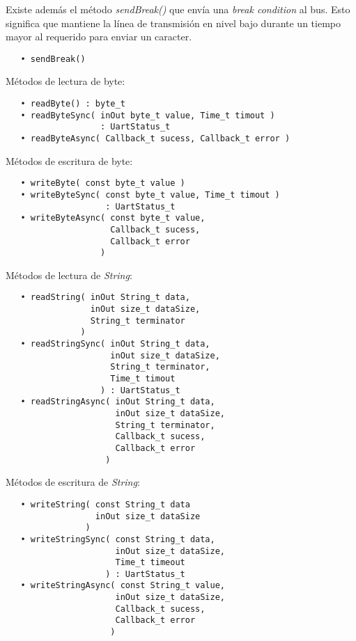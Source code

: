 Existe además el método \emph{sendBreak()} que envía una \emph{break condition} al bus. Esto significa que mantiene la línea de transmisión en nivel bajo durante un tiempo mayor al requerido para enviar un caracter.

\begin{verbatim}
   • sendBreak()
\end{verbatim}


Métodos de lectura de byte:

\begin{verbatim}
   • readByte() : byte_t
   • readByteSync( inOut byte_t value, Time_t timout )
                   : UartStatus_t
   • readByteAsync( Callback_t sucess, Callback_t error )
\end{verbatim}

Métodos de escritura de byte:

\begin{verbatim}
   • writeByte( const byte_t value )
   • writeByteSync( const byte_t value, Time_t timout )
                    : UartStatus_t
   • writeByteAsync( const byte_t value, 
                     Callback_t sucess,
                     Callback_t error 
                   )
\end{verbatim}

Métodos de lectura de \emph{String}:

\begin{verbatim}
   • readString( inOut String_t data,
                 inOut size_t dataSize,
                 String_t terminator
               )
   • readStringSync( inOut String_t data,
                     inOut size_t dataSize,
                     String_t terminator,
                     Time_t timout 
                   ) : UartStatus_t
   • readStringAsync( inOut String_t data,
                      inOut size_t dataSize,
   	                  String_t terminator,
                      Callback_t sucess, 
                      Callback_t error 
                    ) 
\end{verbatim}

Métodos de escritura de \emph{String}:                  
                
\begin{verbatim}  
   • writeString( const String_t data
                  inOut size_t dataSize
                )
   • writeStringSync( const String_t data,
                      inOut size_t dataSize,
                      Time_t timeout
                    ) : UartStatus_t
   • writeStringAsync( const String_t value, 
                      inOut size_t dataSize,
                      Callback_t sucess,
                      Callback_t error
                     )
\end{verbatim}

